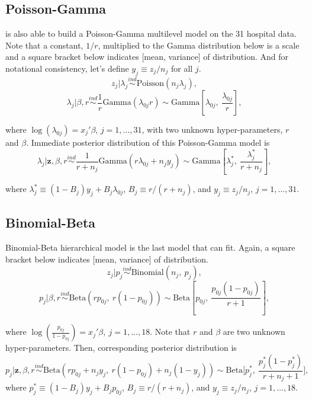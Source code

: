 \documentclass[article]{jss}
\begin{document}
\subsection[Poisson-Gamma]{Poisson-Gamma}
 is also able to build a Poisson-Gamma multilevel model on the 31 hospital data. Note that a constant, $1/r$, multiplied to the Gamma distribution below is a scale and a square bracket below indicates [mean, variance] of distribution. And for notational consistency, let's define $y_{j}\equiv z_{j} / n_{j}$ for all $j$.
\begin{equation}
z_{j}\vert \lambda_{j} \stackrel{ind}{\sim}\textrm{Poisson}(n_{j}\lambda_{j}),
\end{equation}
\begin{equation}
\lambda_{j}\vert \beta, r\stackrel{ind}{\sim}\frac{1}{r}\textrm{Gamma}(\lambda_{0j}r)\sim \textrm{Gamma}[\lambda_{0j}, ~\frac{\lambda_{0j}}{r}],
\end{equation}

where $\log(\lambda_{0j}) =x_{j}'\beta$, $j=1, \ldots, 31$, with two unknown hyper-parameters, $r$ and $\beta$. Immediate posterior distribution of this Poisson-Gamma model is
\begin{equation}
\lambda_{j}\vert \textbf{z}, \beta, r \stackrel{ind}{\sim}\frac{1}{r + n_{j}}\textrm{Gamma}(r\lambda_{0j} + n_{j}y_{j})\sim\textrm{Gamma}[\lambda^{\ast}_{j},~\frac{\lambda^{\ast}_{j}}{r+n_{j}}],
\end{equation}

where $\lambda^{\ast}_{j} \equiv (1-B_{j})y_{j} + B_{j}\lambda_{0j}$,  $B_{j}\equiv r / (r+n_{j})$, and $y_{j}\equiv z_{j} / n_{j}$, $j=1, \ldots, 31$. 

\subsection[Binomial-Beta]{Binomial-Beta}
Binomial-Beta hierarchical model is the last model that  can fit. Again, a square bracket below indicates [mean, variance] of distribution.
\begin{equation}
z_{j} \vert p_{j}\stackrel{ind}{\sim}\textrm{Binomial}(n_{j}, ~p_{j}),
\end{equation}
\begin{equation}
p_{j} \vert \beta, r\stackrel{ind}{\sim}\textrm{Beta}(rp_{0j},~ r(1-p_{0j}))\sim \textrm{Beta}[p_{0j}, ~\frac{p_{0j}(1-p_{0j})}{r + 1}],
\end{equation}

where $\log(\frac{p_{0j}}{1-p_{0j}}) =x_{j}'\beta, ~j=1, \ldots, 18$. Note that $r$ and $\beta$ are two unknown hyper-parameters. Then, corresponding posterior distribution is
\begin{equation}
p_{j}\vert \textbf{z}, \beta, r \stackrel{ind}{\sim}\textrm{Beta}(rp_{0j}+n_{j}y_{j},~r(1-p_{0j})+n_{j}(1-y_{j}))\sim\textrm{Beta}\bigg[p^{\ast}_{j},~ \frac{p^{\ast}_{j}(1-p^{\ast}_{j})}{r+n_{j}+1}\bigg],
\end{equation}
where $p^{\ast}_{j}\equiv(1-B_{j})y_{j}+B_{j}p_{0j}$, $B_{j}\equiv r/ (r+n_{j})$, and $y_{j}\equiv z_{j} / n_{j}$, $j=1,\ldots,18$.
\end{document}
